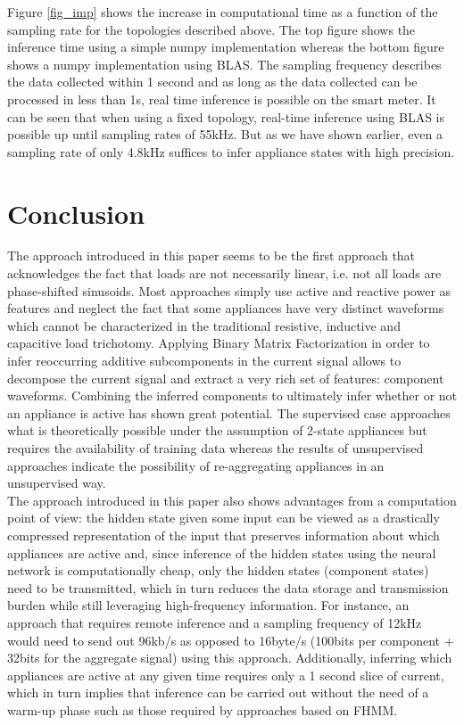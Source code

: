 Figure \ref{fig_imp} shows the increase in computational time as a function of the sampling rate for the topologies described above. The top figure shows the inference time using a simple numpy implementation whereas the bottom figure shows a numpy implementation using BLAS. The sampling frequency describes the data collected within 1 second and as long as the data collected can be processed in less than 1s, real time inference is possible on the smart meter. It can be seen that when using a fixed topology, real-time inference using BLAS is possible up until sampling rates of 55kHz. But as we have shown earlier, even a sampling rate of only 4.8kHz suffices to infer appliance states with high precision.

\section{Conclusion}

The approach introduced in this paper seems to be the first approach that acknowledges the fact that loads are not necessarily linear, i.e. not all loads are phase-shifted sinusoids. Most approaches simply use active and reactive power as features and neglect the fact that some appliances have very distinct waveforms which cannot be characterized in the traditional resistive, inductive and capacitive load trichotomy. Applying Binary Matrix Factorization in order to infer reoccurring additive subcomponents in the current signal allows to decompose the current signal and extract a very rich set of features: component waveforms. Combining the inferred components to ultimately infer whether or not an appliance is active has shown great potential. The supervised case approaches what is theoretically possible under the assumption of 2-state appliances but requires the availability of training data whereas the results of unsupervised approaches indicate the possibility of re-aggregating appliances in an unsupervised way.\\ The approach introduced in this paper also shows advantages from a computation point of view: the hidden state given some input can be viewed as a drastically compressed representation of the input that preserves information about which appliances are active and, since inference of the hidden states using the neural network is computationally cheap, only the hidden states (component states) need to be transmitted, which in turn reduces the data storage and transmission burden while still leveraging high-frequency information. For instance, an approach that requires remote inference and a sampling frequency of 12kHz would need to send out 96kb/s as opposed to 16byte/s (100bits per component + 32bits for the aggregate signal) using this approach. Additionally, inferring which appliances are active at any given time requires only a 1 second slice of current, which in turn implies that inference can be carried out without the need of a warm-up phase such as those required by approaches based on FHMM.

